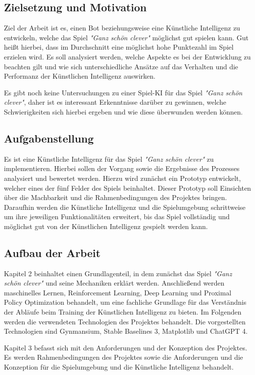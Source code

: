 \subsection{Zielsetzung und Motivation}
Ziel der Arbeit ist es, einen Bot beziehungsweise eine Künstliche Intelligenz zu entwickeln, welche das Spiel \textit{"Ganz schön clever"} möglichst gut spielen kann. Gut heißt hierbei, dass im Durchschnitt eine möglichst hohe Punktezahl im Spiel erzielen wird. Es soll analysiert werden, welche Aspekte es bei der Entwicklung zu beachten gilt und wie sich unterschiedliche Ansätze auf das Verhalten und die Performanz der Künstlichen Intelligenz auswirken.

Es gibt noch keine Untersuchungen zu einer Spiel-KI für das Spiel \textit{"Ganz schön clever"}, daher ist es interessant Erkenntnisse darüber zu gewinnen, welche Schwierigkeiten sich hierbei ergeben und wie diese überwunden werden können.
\subsection{Aufgabenstellung}
Es ist eine Künstliche Intelligenz für das Spiel \textit{"Ganz schön clever"} zu implementieren. Hierbei sollen der Vorgang sowie die Ergebnisse des Prozesses analysiert und bewertet werden. Hierzu wird zunächst ein Prototyp entwickelt, welcher eines der fünf Felder des Spiels beinhaltet. Dieser Prototyp soll Einsichten über die Machbarkeit und die Rahmenbedingungen des Projektes bringen. Daraufhin werden die Künstliche Intelligenz und die Spielumgebung schrittweise um ihre jeweiligen Funktionalitäten erweitert, bis das Spiel vollständig und möglichst gut von der Künstlichen Intelligenz gespielt werden kann.
\subsection{Aufbau der Arbeit}
Kapitel 2 beinhaltet einen Grundlagenteil, in dem zunächst das Spiel \textit{"Ganz schön clever"} und seine Mechaniken erklärt werden. Anschließend werden maschinelles Lernen, Reinforcement Learning, Deep Learning und Proximal Policy Optimization behandelt, um eine fachliche Grundlage für das Verständnis der Abläufe beim Training der Künstlichen Intelligenz zu bieten. Im Folgenden werden die verwendeten Technologien des Projektes behandelt. Die vorgestellten Technologien sind Gynmansium, Stable Baselines 3, Matplotlib und ChatGPT 4.

Kapitel 3 befasst sich mit den Anforderungen und der Konzeption des Projektes. Es werden Rahmenbedingungen des Projektes sowie die Anforderungen und die Konzeption für die Spielumgebung und die Künstliche Intelligenz behandelt.

